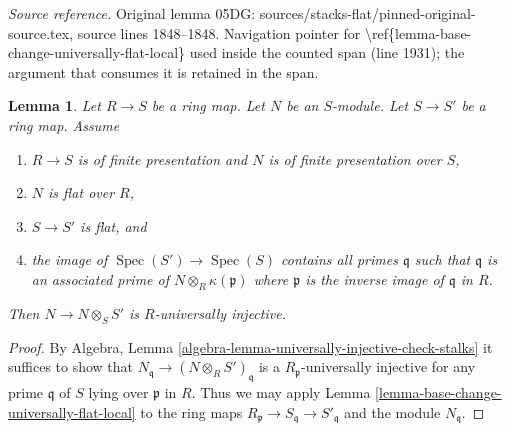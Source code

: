 \documentclass[10pt,a4paper]{amsart}
\theoremstyle{plain}
\newtheorem{lemma}[subsection]{Lemma}
\theoremstyle{definition}
\theoremstyle{remark}
\numberwithin{equation}{subsection}
\def\Spec{\mathop{\mathrm{Spec}}}
\begin{document}
\noindent\textit{Source reference.} Original lemma 05DG: sources/stacks-flat/pinned-original-source.tex, source lines 1848--1848. Navigation pointer for \textbackslash{}ref\{lemma-base-change-universally-flat-local\} used inside the counted span (line 1931); the argument that consumes it is retained in the span.\par\medskip
\begin{lemma}
\label{lemma-base-change-universally-flat}
Let $R \to S$ be a ring map.
Let $N$ be an $S$-module.
Let $S \to S'$ be a ring map.
Assume
\begin{enumerate}
\item $R \to S$ is of finite presentation and $N$ is of finite presentation
over $S$,
\item $N$ is flat over $R$,
\item $S \to S'$ is flat, and
\item the image of $\Spec(S') \to \Spec(S)$ contains
all primes $\mathfrak q$ such that $\mathfrak q$ is an associated prime
of $N \otimes_R \kappa(\mathfrak p)$ where $\mathfrak p$ is the inverse
image of $\mathfrak q$ in $R$.
\end{enumerate}
Then $N \to N \otimes_S S'$ is $R$-universally injective.
\end{lemma}

\begin{proof}
By
Algebra, Lemma \ref{algebra-lemma-universally-injective-check-stalks}
it suffices to show that $N_{\mathfrak q} \to (N \otimes_R S')_{\mathfrak q}$
is a $R_{\mathfrak p}$-universally injective for any prime $\mathfrak q$
of $S$ lying over $\mathfrak p$ in $R$. Thus we may apply
Lemma \ref{lemma-base-change-universally-flat-local}
to the ring maps
$R_{\mathfrak p} \to S_{\mathfrak q} \to S'_{\mathfrak q}$
and the module $N_{\mathfrak q}$.
\end{proof}
\end{document}
